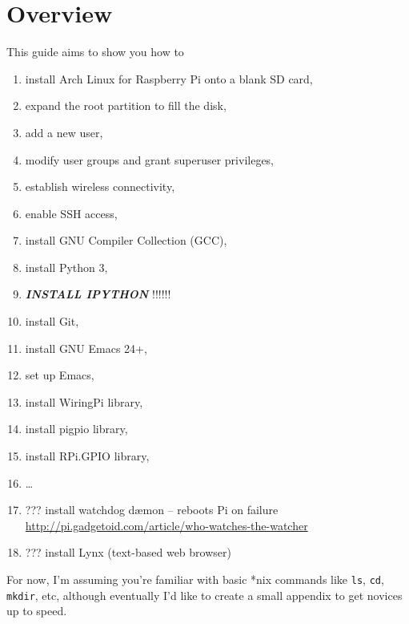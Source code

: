 \documentclass[12pt,letterpaper]{article}
\newcommand\EMPH[1]{\textbf{\textit{#1}}}
\begin{document}
\section{Overview}
This guide aims to show you how to
\begin{enumerate}
\item install Arch Linux for Raspberry Pi onto a blank SD card,
\item expand the root partition to fill the disk,
\item add a new user,
\item modify user groups and grant superuser privileges,
\item establish wireless connectivity,
\item enable SSH access,
\item install GNU Compiler Collection (GCC), %
\item install Python 3,
\item \EMPH{INSTALL IPYTHON} !!!!!! %
\item install Git,
\item install GNU Emacs 24+,
\item set up Emacs,
\item install WiringPi library,
\item install pigpio library,
\item install RPi.GPIO library,
\item \ldots
\item ??? install watchdog d\ae mon -- reboots Pi on failure \url{http://pi.gadgetoid.com/article/who-watches-the-watcher}
\item ??? install Lynx (text-based web browser)
\end{enumerate}

For now, I'm assuming you're familiar with basic *nix commands like \lstinline{ls}, \lstinline{cd}, \lstinline{mkdir}, etc, although eventually I'd like to create a small appendix to get novices up to speed.
\end{document}
